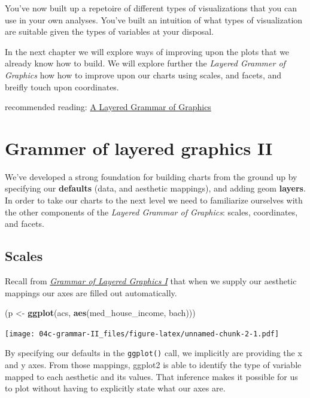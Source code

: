 \documentclass[
]{book}
\newenvironment{Shaded}{\begin{snugshade}}{\end{snugshade}}
\newcommand{\KeywordTok}[1]{\textcolor[rgb]{0.13,0.29,0.53}{\textbf{#1}}}
\newcommand{\NormalTok}[1]{#1}
\newcommand{\StringTok}[1]{\textcolor[rgb]{0.31,0.60,0.02}{#1}}
\begin{document}
You've now built up a repetoire of different types of visualizations that you can use in your own analyses. You've built an intuition of what types of visualization are suitable given the types of variables at your disposal.

In the next chapter we will explore ways of improving upon the plots that we already know how to build. We will explore further the \emph{Layered Grammer of Graphics} how how to improve upon our charts using scales, and facets, and breifly touch upon coordinates.

recommended reading: \href{https://vita.had.co.nz/papers/layered-grammar.pdf}{A Layered Grammar of Graphics}

\hypertarget{grammer-of-layered-graphics-ii}{%
\chapter{Grammer of layered graphics II}\label{grammer-of-layered-graphics-ii}}

We've developed a strong foundation for building charts from the ground up by specifying our \textbf{defaults} (data, and aesthetic mappings), and adding geom \textbf{layers}. In order to take our charts to the next level we need to familiarize ourselves with the other components of the \emph{Layered Grammar of Graphics}: scales, coordinates, and facets.

\hypertarget{scales}{%
\section{Scales}\label{scales}}

Recall from \emph{\protect\hyperlink{layered-i}{Grammar of Layered Graphics I}} that when we supply our aesthetic mappings our axes are filled out automatically.

\begin{Shaded}
\begin{Highlighting}[]
\NormalTok{(p \textless{}{-}}\StringTok{ }\KeywordTok{ggplot}\NormalTok{(acs, }\KeywordTok{aes}\NormalTok{(med\_house\_income, bach)))}
\end{Highlighting}
\end{Shaded}

\texttt{[image: 04c-grammar-II\_files/figure-latex/unnamed-chunk-2-1.pdf]}

By specifying our defaults in the \texttt{ggplot()} call, we implicitly are providing the x and y axes. From those mappings, ggplot2 is able to identify the type of variable mapped to each aesthetic and its values. That inference makes it possible for us to plot without having to explicitly state what our axes are.
\end{document}
